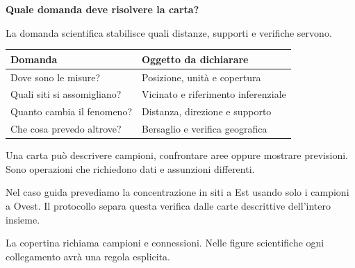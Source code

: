 \documentclass[12pt,aspectratio=1610]{beamer}
\newcommand{\PBody}[1]{\par{\fontsize{11.3}{14.8}\selectfont #1\par}}
\newcommand{\PSmall}[1]{\par{\fontsize{9.8}{13.1}\selectfont #1\par}}
\newcommand{\PInfo}[1]{%
\begin{tcolorbox}[enhanced,arc=1.6mm,boxrule=.55pt,colback=GeoTint,
 colframe=Rule!80!Classical,left=2.3mm,right=2.3mm,top=2mm,bottom=2mm,
 before skip=1mm,after skip=1mm]
\PSmall{#1}\end{tcolorbox}}
\begin{document}
\begin{frame}[plain]\hypertarget{slide4}{}
\begin{lrbox}{\TitleBox}
\begin{minipage}[t]{17.7cm}\raggedright\color{Ink}\fontsize{11.3}{14.8}\selectfont
\color{Navy}\bfseries\fontsize{20.6}{24.5}\selectfont Quale domanda deve risolvere la carta?
\end{minipage}\end{lrbox}

\begin{lrbox}{\RecallBox}
\begin{minipage}[t]{14.3cm}\raggedright\color{Ink}\fontsize{11.3}{14.8}\selectfont
\fontsize{10.3}{13.8}\selectfont La domanda scientifica stabilisce quali distanze, supporti e verifiche servono.
\end{minipage}\end{lrbox}

\begin{lrbox}{\PilotLeftBox}
\begin{minipage}[t]{10.05cm}\raggedright\color{Ink}\fontsize{11.3}{14.8}\selectfont
{\fontsize{10.2}{13.1}\selectfont\renewcommand{\arraystretch}{1.45}\begin{tabular}{@{}p{4.5cm}p{4.5cm}@{}}\toprule
\textbf{Domanda} & \textbf{Oggetto da dichiarare}\\\midrule
Dove sono le misure? & Posizione, unità e copertura\\
Quali siti si assomigliano? & Vicinato e riferimento inferenziale\\
Quanto cambia il fenomeno? & Distanza, direzione e supporto\\
Che cosa prevedo altrove? & Bersaglio e verifica geografica\\
\bottomrule\end{tabular}}

\end{minipage}\end{lrbox}

\begin{lrbox}{\PilotRightBox}
\begin{minipage}[t]{7.55cm}\raggedright\color{Ink}\fontsize{11.3}{14.8}\selectfont
\PBody{Una carta può descrivere campioni, confrontare aree oppure mostrare previsioni. Sono operazioni che richiedono dati e assunzioni differenti.}
\vspace{2.5mm}
\PInfo{Nel caso guida prevediamo la concentrazione in siti a Est usando solo i campioni a Ovest. Il protocollo separa questa verifica dalle carte descrittive dell’intero insieme.}
\PBody{La copertina richiama campioni e connessioni. Nelle figure scientifiche ogni collegamento avrà una regola esplicita.}
\vspace{2.5mm}


\end{minipage}
\end{lrbox}
\end{frame}
\end{document}
